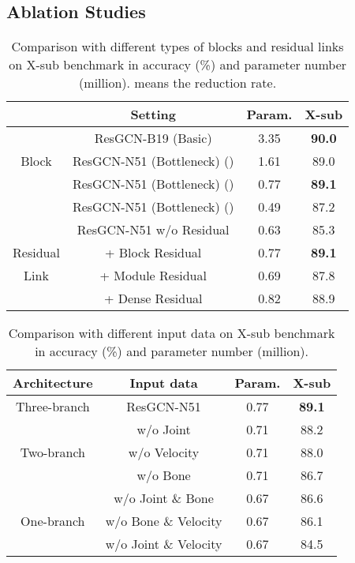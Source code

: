 \documentclass[sigconf]{acmart}
\begin{document}
\subsection{Ablation Studies}
\label{ssec:ablation}

\begin{table}
  \begin{center}
  \begin{tabular}{c|cc|c}
  \hline
  & Setting & Param. & X-sub \\
  \hline
  \hline
  & ResGCN-B19 (Basic) & 3.35 & {\bf 90.0} \\
  Block & ResGCN-N51 (Bottleneck) () & 1.61 & 89.0 \\
  & ResGCN-N51 (Bottleneck) () & 0.77 & {\bf 89.1} \\
  & ResGCN-N51 (Bottleneck) () & 0.49 & 87.2 \\
  \hline
  \hline
  & ResGCN-N51 w/o Residual & 0.63 & 85.3 \\
  Residual & + Block Residual & 0.77 & {\bf 89.1} \\
  Link & + Module Residual & 0.69 & 87.8 \\
  & + Dense Residual & 0.82 & 88.9 \\
  \hline
  \end{tabular}
  \end{center}
  \caption{Comparison with different types of blocks and residual links on X-sub benchmark in accuracy (\%) and parameter number (million).  means the reduction rate.}\label{tab:setting}
  \vspace{-0.4cm}
\end{table}

\begin{table}
  \begin{center}
  \begin{tabular}{c|cc|c}
  \hline
  Architecture & Input data & Param. & X-sub \\
  \hline
  \hline
  Three-branch & ResGCN-N51 & 0.77 & {\bf 89.1} \\
  \hline
  & w/o Joint & 0.71 & 88.2 \\
  Two-branch & w/o Velocity & 0.71 & 88.0 \\
  & w/o Bone & 0.71 & 86.7 \\
  \hline
  & w/o Joint \& Bone & 0.67 & 86.6 \\
  One-branch & w/o Bone \& Velocity & 0.67 & 86.1 \\
  & w/o Joint \& Velocity & 0.67 & 84.5 \\
  \hline
  \end{tabular}
  \end{center}
  \caption{Comparison with different input data on X-sub benchmark in accuracy (\%) and parameter number (million).}\label{tab:input}
  \vspace{-0.4cm}
\end{table}
\end{document}
